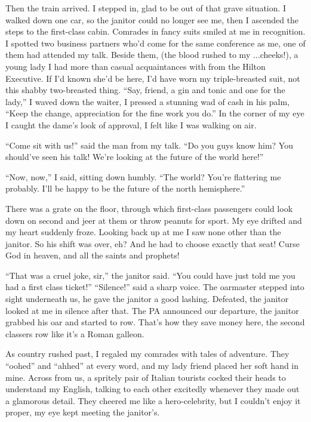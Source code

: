 \documentclass[oneside]{book}
\begin{document}
Then the train arrived.  I stepped in, glad to be out of that grave situation.  I walked down one car, so the
janitor could no longer see me, then I ascended the steps to the first-class cabin.  Comrades in fancy suits
smiled at me in recognition.  I spotted two business partners who'd come for the same conference as me,
one of them had attended my talk.  Beside them, (the blood rushed to my $\ldots$cheeks!), a young lady I had more
than casual acquaintances with from the Hilton Executive.  If I'd known she'd be here, I'd have worn my
triple-breasted suit, not this shabby two-breasted thing.  ``Say, friend, a gin and tonic and one for the lady,''
I waved down the waiter, I pressed a stunning wad of cash in his palm, ``Keep the change,
appreciation for the fine work you do.''  In the corner of my eye I caught the dame's look of approval,
I felt like I was walking on air.

``Come sit with us!'' said the man from my talk.  ``Do you guys know him?
You should've seen his talk!  We're looking at the future of the world here!''

``Now, now,'' I said, sitting down humbly.  ``The world?  You're flattering me probably.  I'll be happy
to be the future of the north hemisphere.''

There was a grate on the floor, through which first-class passengers could look down on second
and jeer at them or throw peanuts for sport.  My eye drifted and my heart suddenly
froze.  Looking back up at me I saw none other than the janitor.  So his shift was over, eh?  And he had to
choose exactly that seat!  Curse God in heaven, and all the saints and prophets!

``That was a cruel joke, sir,'' the janitor said.  ``You could have just told me you had a first class
ticket!''  ``Silence!'' said a sharp voice.  The oarmaster stepped into sight underneath us, he gave the janitor
a good lashing.  Defeated, the janitor looked at me in silence after that.  The PA announced our departure,
the janitor grabbed his oar and started to row.  That's how they save money here, the second classers row like
it's a Roman galleon.

As country rushed past, I regaled my comrades with tales of adventure.  They ``oohed'' and ``ahhed'' at
every word, and my lady friend placed her soft hand in mine.  Across from us, a spritely pair of
Italian tourists cocked their heads to understand my English, talking to each other excitedly whenever they made
out a glamorous detail.  They cheered me like a hero-celebrity, but I couldn't enjoy it proper,
my eye kept meeting the janitor's.
\end{document}
